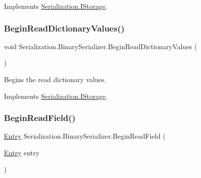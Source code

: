 Implements \hyperlink{interface_serialization_1_1_i_storage_ab25360e5a7b453f7cbcf2a8d98ea0eb8}{Serialization.\+I\+Storage}.

\mbox{\label{class_serialization_1_1_binary_serializer_ade68463fa1bf913dd9f768b4edfed5bc}} 
\subsubsection{\texorpdfstring{Begin\+Read\+Dictionary\+Values()}{BeginReadDictionaryValues()}}
{\footnotesize\ttfamily void Serialization.\+Binary\+Serializer.\+Begin\+Read\+Dictionary\+Values (\begin{DoxyParamCaption}{ }\end{DoxyParamCaption})\hspace{0.3cm}{\ttfamily [inline]}}



Begins the read dictionary values. 



Implements \hyperlink{interface_serialization_1_1_i_storage_ad25b5e89d4ae0b91dccf8c0ce2187f15}{Serialization.\+I\+Storage}.

\mbox{\label{class_serialization_1_1_binary_serializer_ab6dd090acf50ee9f39d461fa7e7c61d6}} 
\subsubsection{\texorpdfstring{Begin\+Read\+Field()}{BeginReadField()}}
{\footnotesize\ttfamily \hyperlink{class_serialization_1_1_entry}{Entry} Serialization.\+Binary\+Serializer.\+Begin\+Read\+Field (\begin{DoxyParamCaption}\item[{\hyperlink{class_serialization_1_1_entry}{Entry}}]{entry }\end{DoxyParamCaption})\hspace{0.3cm}{\ttfamily [inline]}}



